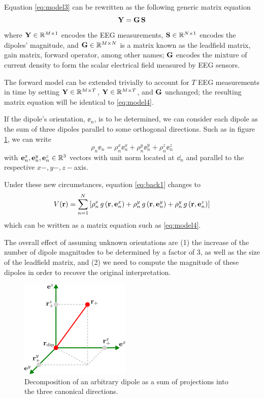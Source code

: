 Equation \eqref{eq:model3} can be rewritten as the following generic matrix equation
\begin{equation}
\mathbf{Y} = \mathbf{G}\, \mathbf{S}
\label{eq:model4}
\end{equation}
where $\mathbf{Y} \in \mathbb{R}^{M\times 1}$ encodes the EEG measurements, $\mathbf{S} \in \mathbb{R}^{N\times 1}$ encodes the dipoles' magnitude, and $\mathbf{G} \in \mathbb{R}^{M\times N}$ is a matrix known as the leadfield matrix, gain matrix, forward operator, among other names; $\mathbf{G}$ encodes the mixture of current density to form the scalar electrical field measured by EEG sensors.

The forward model can be extended trivially to account for $T$ EEG measurements in time by setting $\mathbf{Y} \in \mathbb{R}^{M\times T}$, $\mathbf{Y} \in \mathbb{R}^{M\times T}$, and $\mathbf{G}$ unchanged; the resulting matrix equation will be identical to \eqref{eq:model4}.


If the dipole's orientation, $\ee_n$, is to be determined, we can consider each dipole as the sum of three dipoles parallel to some orthogonal directions. Such as in figure \ref{fig:diagrams3}, we can write
\begin{equation}
\rho_n \ee_n = \rho^x_n \ee_n^x + \rho_n^y \ee_n^y + \rho_n^z \ee_n^z
\end{equation}
with $\mathbf{e}_n^x, \mathbf{e}_n^y, \mathbf{e}_n^z \in \mathbb{R}^3$ vectors with unit norm located at $\dd_n$ and parallel to the respective $x-, y-, z-$axis.
%

Under these new circumstances, equation \eqref{eq:back1} changes to
\begin{equation}
V(\mathbf{r}) = 
\sum_{n=1}^N 
\left[ 
\rho_n^x\, g\left( \mathbf{r}, \mathbf{e}_n^x \right) +
\rho_n^y\, g\left( \mathbf{r}, \mathbf{e}_n^y \right) +
\rho_n^y\, g\left( \mathbf{r}, \mathbf{e}_n^z \right)
 \right]
\end{equation}
which can be written as a matrix equation such as \eqref{eq:model4}.

The overall effect of assuming unknown orientations are (1) the increase of the number of dipole magnitudes to be determined by a factor of 3, as well as the size of the leadfield matrix, and (2)
we need to compute the magnitude of these dipoles in order to recover the original interpretation.

\begin{figure}
\centering
\includegraphics{./img_dev/OrthDecompOld}
\caption{Decomposition of an arbitrary dipole as a sum of projections into the three canonical directions.}
\label{fig:diagrams3}
\end{figure}

